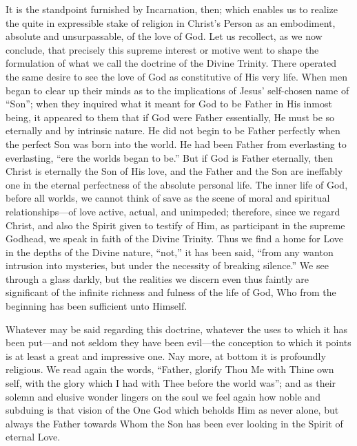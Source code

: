 \documentclass[12pt,a5paper,oneside]{book}
\begin{document}
It is the standpoint furnished by Incarnation,
then; which enables us to realize the quite in
expressible stake of religion in Christ's Person
as an embodiment, absolute and unsurpassable,
of the love of God. Let us recollect, as we
now conclude, that precisely this supreme
interest or motive went to shape the formulation
of what we call the doctrine of the Divine
Trinity. There operated the same desire to see
the love of God as constitutive of His very life.
When men began to clear up their minds as
to the implications of Jesus' self-chosen name
of ``Son''; when they inquired what it meant
for God to be Father in His inmost being,
it appeared to them that if God were Father
essentially, He must be so eternally and by
intrinsic nature. He did not begin to be
Father perfectly when the perfect Son was
born into the world. He had been Father
from everlasting to everlasting, ``ere the worlds
began to be.'' But if God is Father eternally,
then Christ is eternally the Son of His love,
and the Father and the Son are ineffably one
in the eternal perfectness of the absolute personal 
life. The inner life of God, before all
worlds, we cannot think of save as the scene
of moral and spiritual relationships---of love
active, actual, and unimpeded; therefore,
since we regard Christ, and also the Spirit
given to testify of Him, as participant in the
supreme Godhead, we speak in faith of the
Divine Trinity. Thus we find a home for
Love in the depths of the Divine nature, ``not,''
it has been said, ``from any wanton intrusion
into mysteries, but under the necessity of
breaking silence.'' We see through a glass
darkly, but the realities we discern even thus
faintly are significant of the infinite richness 
and fulness of the life of God, Who
from the beginning has been sufficient unto
Himself.

Whatever may be said regarding this doctrine,
whatever the uses to which it has been put---and 
not seldom they have been evil---the conception 
to which it points is at least a great
and impressive one. Nay more, at bottom
it is profoundly religious. We read again the
words, ``Father, glorify Thou Me with Thine
own self, with the glory which I had with
Thee before the world was''; and as their
solemn and elusive wonder lingers on the soul
we feel again how noble and subduing is that
vision of the One God which beholds Him as
never alone, but always the Father towards
Whom the Son has been ever looking in the
Spirit of eternal Love.
\end{document}
